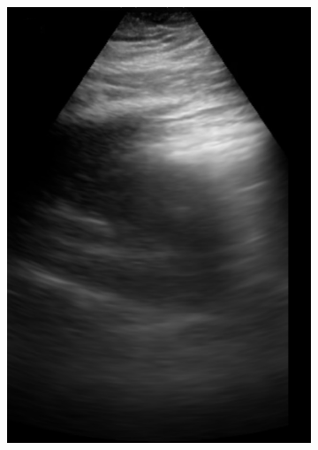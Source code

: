 \documentclass[12pt]{article} %
\begin{document}
	\begin{figure}
	\centering
		\begin{subfigure}{0.3\textwidth}
		\centering
		\includegraphics[width=\textwidth]{figuras/centroid_0.jpg}
		\end{subfigure}
		\begin{subfigure}{0.3\textwidth}
		\centering

\end{subfigure}
\end{figure}
\end{document}
